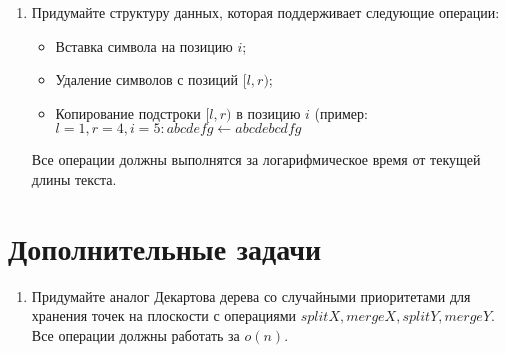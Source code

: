 \begin{enumerate}
	\item Придумайте структуру данных, которая поддерживает следующие операции:
	
	\begin{itemize}
		\item Вставка символа на позицию $i$;
		\item Удаление символов с позиций $[l, r)$;
		\item Копирование подстроки $[l, r)$ в позицию $i$ (пример: $l = 1, r = 4, i = 5 : abcdefg \leftarrow abcdebcdfg$
	\end{itemize}
	
	Все операции должны выполнятся за логарифмическое время от текущей длины текста.
	
\end{enumerate}

\section*{Дополнительные задачи}
\begin{enumerate}
	\item Придумайте аналог Декартова дерева со случайными приоритетами для хранения точек на плоскости с операциями $splitX, mergeX, splitY, mergeY$. Все операции должны работать за $o(n)$.
\end{enumerate}

